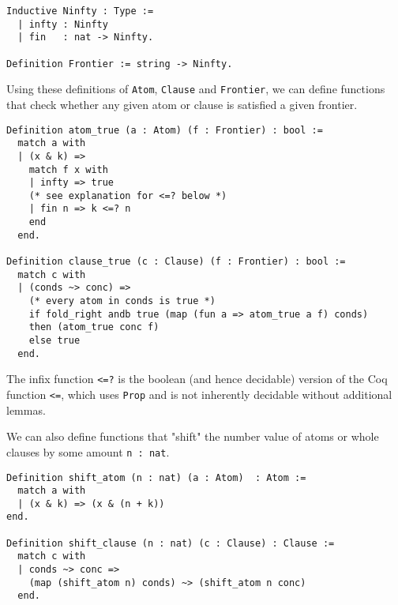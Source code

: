\begin{minipage}{\linewidth}
\begin{lstlisting}[language=Coq, label={lst:ninfty_frontier_def}, caption={\lstinline{Ninfty} and \lstinline{Frontier} in Coq}]
Inductive Ninfty : Type :=
  | infty : Ninfty
  | fin   : nat -> Ninfty.

Definition Frontier := string -> Ninfty.
\end{lstlisting}
\end{minipage}

Using these definitions of \lstinline{Atom}, \lstinline{Clause} and \lstinline{Frontier},
we can define functions that check whether any given atom or clause is satisfied a given frontier.

\begin{minipage}{\linewidth}
\begin{lstlisting}[language=Coq, label={lst:atom_clause_true_def}, caption={\lstinline{atom_true} and \lstinline{clause_true} in Coq}]
Definition atom_true (a : Atom) (f : Frontier) : bool :=
  match a with
  | (x & k) =>
    match f x with
    | infty => true
    (* see explanation for <=? below *)
    | fin n => k <=? n
    end
  end.

Definition clause_true (c : Clause) (f : Frontier) : bool :=
  match c with
  | (conds ~> conc) =>
    (* every atom in conds is true *)
    if fold_right andb true (map (fun a => atom_true a f) conds)
    then (atom_true conc f)
    else true
  end.
\end{lstlisting}
\end{minipage}

The infix function \lstinline{<=?} is the boolean (and hence decidable) version of the
Coq function \lstinline{<=}, which uses \lstinline{Prop} and is not inherently decidable without
additional lemmas.

We can also define functions that "shift" the number value of atoms or whole clauses by some amount \lstinline{n : nat}.

\begin{minipage}{\linewidth}
\begin{lstlisting}[language=Coq, label={lst:shift_atom_clause_true}, caption={\lstinline{shift_atom} and \lstinline{shift_clause} in Coq}]
Definition shift_atom (n : nat) (a : Atom)  : Atom :=
  match a with
  | (x & k) => (x & (n + k))
end.

Definition shift_clause (n : nat) (c : Clause) : Clause :=
  match c with
  | conds ~> conc =>
    (map (shift_atom n) conds) ~> (shift_atom n conc)
  end.
\end{lstlisting}
\end{minipage}

